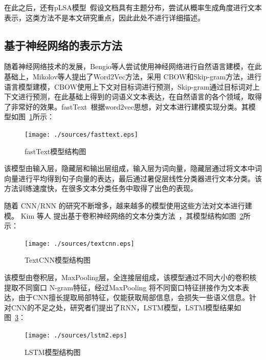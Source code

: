 在此之后，还有pLSA模型~\cite{Hofmann99}假设文档具有主题分布，尝试从概率生成角度进行文本表示，这类方法不是本文研究重点，因此此处不进行详细描述。

\subsection{基于神经网络的表示方法}
随着神经网络技术的发展，Bengio等人尝试使用神经网络进行自然语言建模\cite{BengioDV00}，在此基础上，Mikolov等人提出了Word2Vec方法\cite{abs-1301-3781}，采用 CBOW和Skip-gram方法，进行语言模型建模，CBOW使用上下文对目标词进行预测，Skip-gram通过目标词对上下文进行预测，在此基础上得到的词语义文本表达，在自然语言的各个领域，取得了非常好的效果。fastText~\cite{GraveMJB17}根据word2vec思想，对文本进行建模实现分类。其模型如图~\ref{fig:fasttext}所示：
\begin{figure}[htb]
    \centering
    \texttt{[image: ./sources/fasttext.eps]}
    \vspace{-10pt}
    \caption{\label{fig:fasttext} fastText模型结构图}
    \vspace{-5pt}
\end{figure}

该模型由输入层，隐藏层和输出层组成，输入层为词向量，隐藏层通过将文本中词向量进行平均得到句子向量的表达，最后通过暑促层线性分类器进行文本分类。该方法训练速度快，在很多文本分类任务中取得了出色的表现。

随着 CNN/RNN 的研究不断增多，越来越多的模型使用这些方法对文本进行建模。 Kim 等人
提出基于卷积神经网络的文本分类方法~\cite{Kim14}，其模型结构如图~\ref{fig:textcnn}所示：
\begin{figure}[htb]
    \centering
    \texttt{[image: ./sources/textcnn.eps]}
    \vspace{-10pt}
    \caption{\label{fig:textcnn} TextCNN模型结构图}
    \vspace{-5pt}
\end{figure}

该模型由卷积层，MaxPooling层，全连接层组成，该模型通过不同大小的卷积核提取不同窗口 N-gram特征，经过MaxPooling 将不同窗口特征拼接作为文本表达，由于CNN擅长提取局部特征，仅能获取局部信息，会损失一些语义信息。针对CNN的不足之处，研究者们提出了RNN，LSTM模型，LSTM模型结果如图~\ref{fig:lstm}：
\begin{figure}[htb]
    \centering
    \texttt{[image: ./sources/lstm2.eps]}
    \vspace{-10pt}
    \caption{\label{fig:lstm} LSTM模型结构图}
    \vspace{-5pt}
\end{figure}

